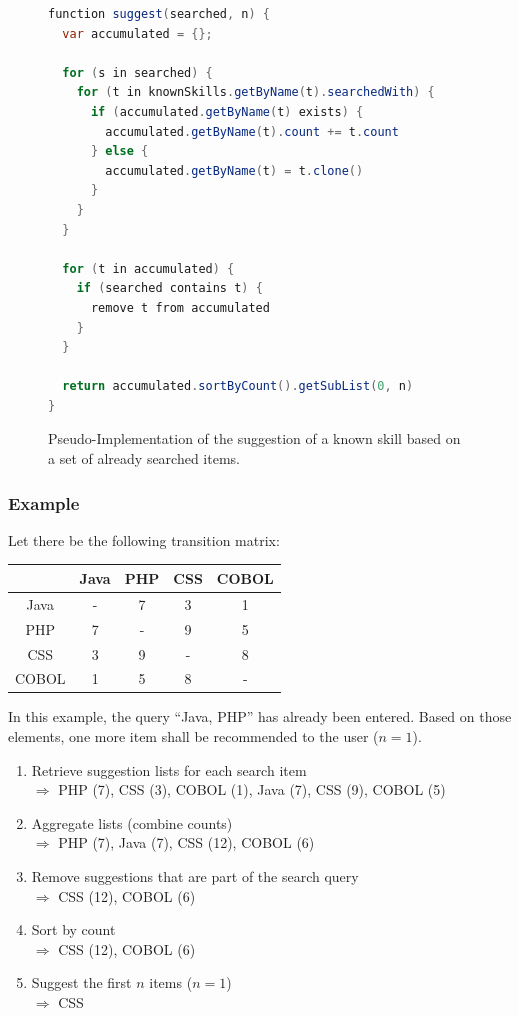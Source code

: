 \newpage

\begin{figure}[!htp]
\begin{lstlisting}[language=Java]
function suggest(searched, n) {
  var accumulated = {};

  for (s in searched) {
    for (t in knownSkills.getByName(t).searchedWith) {
      if (accumulated.getByName(t) exists) {
        accumulated.getByName(t).count += t.count
      } else {
        accumulated.getByName(t) = t.clone()
      }
    }
  }

  for (t in accumulated) {
    if (searched contains t) {
      remove t from accumulated
    }
  }

  return accumulated.sortByCount().getSubList(0, n)
}

\end{lstlisting}
\caption[Pseudocode: Skill Suggestion Algorithm]{Pseudo-Implementation of the suggestion of a known skill based on a set of already searched items.}
\end{figure}

\newpage

\subsubsection{Example}
Let there be the following transition matrix:

\begin{center}
\begin{tabular}{c | c |c | c | c}
		  & Java & PHP & CSS & COBOL\\
	\hline
	Java  &  -   &  7  &  3  &   1  \\
	\hline
	PHP   &  7   &  -  &  9  &   5  \\
	\hline
	CSS   &  3   &  9  &  -  &   8  \\
	\hline
	COBOL &  1   &  5  &  8  &   -  \\
\end{tabular}
\end{center}

In this example, the query ``Java, PHP'' has already been entered. Based on those elements, one more item shall be recommended to the user ($n = 1$).
\begin{enumerate}
	\item Retrieve suggestion lists for each search item\\
		$\Rightarrow$ PHP (7), CSS (3), COBOL (1), Java (7), CSS (9), COBOL (5)
	\item Aggregate lists (combine counts)\\
		$\Rightarrow$ PHP (7), Java (7), CSS (12), COBOL (6)
	\item Remove suggestions that are part of the search query\\
		$\Rightarrow$ CSS (12), COBOL (6)
	\item Sort by count\\
		$\Rightarrow$ CSS (12), COBOL (6)
	\item Suggest the first $n$ items ($n = 1$)\\
		$\Rightarrow$ CSS
\end{enumerate}

